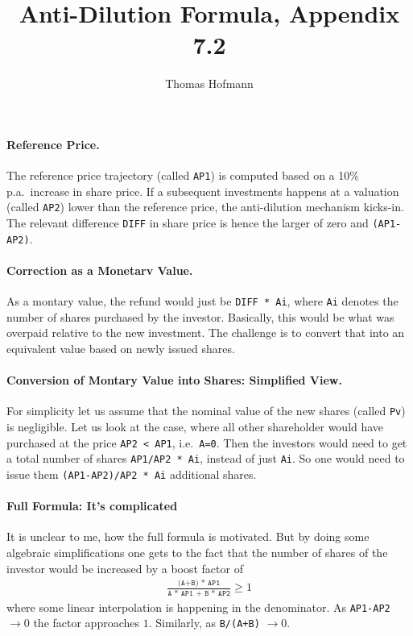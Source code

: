 \documentclass{article}
\title{
	Anti-Dilution Formula, Appendix 7.2
}
\author{
	Thomas Hofmann 
}
\begin{document}
\maketitle 

\paragraph{Reference Price.} The reference price trajectory (called \texttt{AP1}) is computed based on a 10\% p.a.~increase in share price. If a subsequent investments happens at a valuation (called \texttt{AP2}) lower than the reference price, the anti-dilution mechanism kicks-in. The relevant difference \texttt{DIFF} in share price is hence the larger of zero and \texttt{(AP1-AP2)}.

\paragraph{Correction as a Monetarv Value.} As a montary value, the refund would just be \texttt{DIFF * Ai}, where \texttt{Ai} denotes the number of shares purchased by the investor. Basically, this would be what was overpaid relative to the new investment. The challenge is to convert that into an equivalent  value based on newly issued shares. 

\paragraph{Conversion of Montary Value into Shares: Simplified View.} For simplicity let us assume that the nominal value of the new shares (called \texttt{Pv}) is negligible. Let us look at the case, where all other shareholder would have purchased at the price \texttt{AP2 < AP1}, i.e.~\texttt{A=0}. Then the investors would need to get a total number of shares  \texttt{AP1/AP2 * Ai}, instead of just \texttt{Ai}. So one would need to issue them \texttt{(AP1-AP2)/AP2 * Ai} additional shares. 

\paragraph{Full Formula: It's complicated} It is unclear to me, how the full formula is motivated. But by doing some algebraic simplifications one gets to the fact that the number of shares of the investor would be increased by a boost factor of 
\begin{align*}
\frac{ \texttt{(A+B) * AP1}}{\texttt{A * AP1 + B * AP2}} \ge 1
\end{align*}
where some linear interpolation is happening in the denominator.  As \texttt{AP1-AP2}$\to 0$  the factor approaches $1$. Similarly, as \texttt{B/(A+B)} $\to 0$. 
\end{document}
